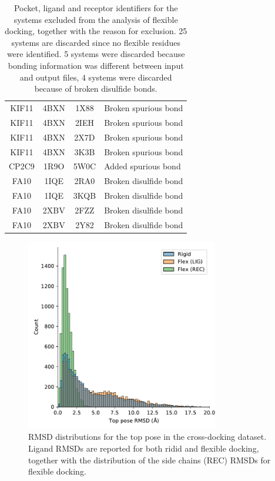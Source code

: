 \documentclass[journal=jcisd8,manuscript=article]{achemso}
\begin{document}
\begin{table}[]
\begin{tabular}{c c c l}
KIF11 & 4BXN & 1X88 & Broken spurious bond \\
KIF11 & 4BXN & 2IEH & Broken spurious bond \\
KIF11 & 4BXN & 2X7D & Broken spurious bond \\
KIF11 & 4BXN & 3K3B & Broken spurious bond \\
CP2C9 & 1R9O & 5W0C & Added spurious bond \\
FA10 & 1IQE & 2RA0 & Broken disulfide bond \\
FA10 & 1IQE & 3KQB & Broken disulfide bond \\
FA10 & 2XBV	& 2FZZ & Broken disulfide bond \\
FA10 & 2XBV	& 2Y82 & Broken disulfide bond \\
\bottomrule
    \end{tabular}
    \caption{Pocket, ligand and receptor identifiers for the systems excluded from the analysis of flexible docking, together with the reason for exclusion. 25 systems are discarded since no flexible residues were identified. 5 systems were discarded because bonding information was different between input and output files, 4 systems were discarded because of broken disulfide bonds.}
    \label{tab:flexfail}
\end{table}

\begin{figure}    
	\centering
	\includegraphics[width=0.75\textwidth]{figures/crossdocking-flex/rmsd_dists_all.pdf}
	\caption{RMSD distributions for the top pose in the cross-docking dataset. Ligand RMSDs are reported for both ridid and flexible docking, together with the distribution of the side chains (REC) RMSDs for flexible docking.}
	\label{fig:flexRMSDalldist}
\end{figure}  
\end{document}
